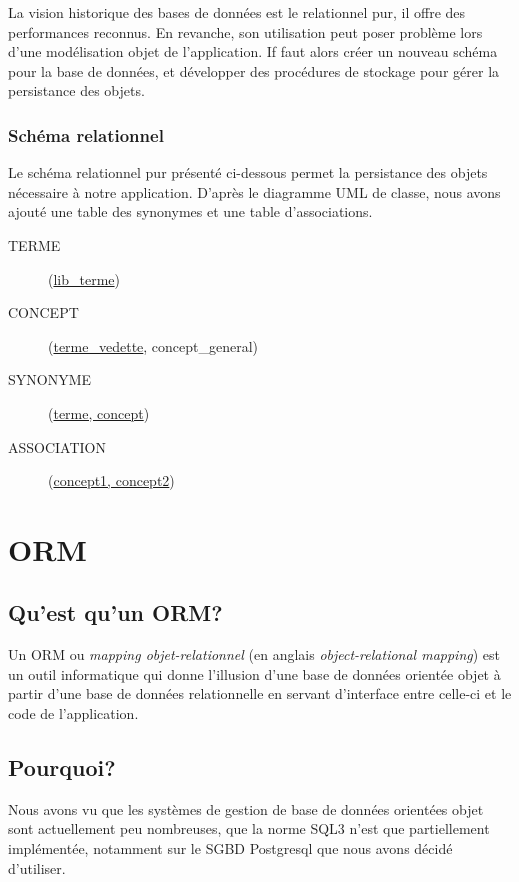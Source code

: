 La vision historique des bases de données est le relationnel pur, il offre des performances reconnus. En revanche, son utilisation peut poser problème lors d'une modélisation objet de l'application. If faut alors créer un nouveau schéma pour la base de données, et développer des procédures de stockage pour gérer la persistance des objets.

\subsubsection{Schéma relationnel}

Le schéma relationnel pur présenté ci-dessous permet la persistance des objets nécessaire à notre application. D'après le diagramme UML de classe, nous avons ajouté une table des synonymes et une table d'associations.

\begin{description}
\item[TERME](\underline{lib\_terme})
\item[CONCEPT](\underline{terme\_vedette}\up{\#}, concept\_general\up{\#})
\item[SYNONYME](\underline{terme\up{\#}, concept\up{\#}})
\item[ASSOCIATION](\underline{concept1\up{\#}, concept2\up{\#}})
\end{description}

\section{ORM}

	\subsection{Qu'est qu'un ORM?}
    Un ORM ou \emph{mapping objet-relationnel} (en anglais \emph{object-relational mapping}) est un outil informatique qui donne l'illusion d'une base de données orientée objet à partir d'une base de données relationnelle en servant d'interface entre celle-ci et le code de l'application.
   
	\subsection{Pourquoi?}
    Nous avons vu que les systèmes de gestion de base de données orientées objet sont actuellement peu nombreuses, que la norme SQL3 n'est que partiellement implémentée, notamment sur le SGBD Postgresql que nous avons décidé d'utiliser.
    
